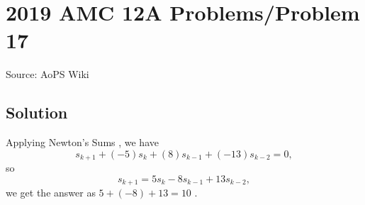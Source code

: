 \documentclass[12pt]{article}
\begin{document}
\section*{{2019 AMC 12A Problems/Problem 17}}
Source: AoPS Wiki

\subsection*{Solution}
Applying Newton's Sums , we have \[s_{k+1}+(-5)s_k+(8)s_{k-1}+(-13)s_{k-2}=0,\] so \[s_{k+1}=5s_k-8s_{k-1}+13s_{k-2},\] we get the answer as $5+(-8)+13=10$ .
\end{document}
